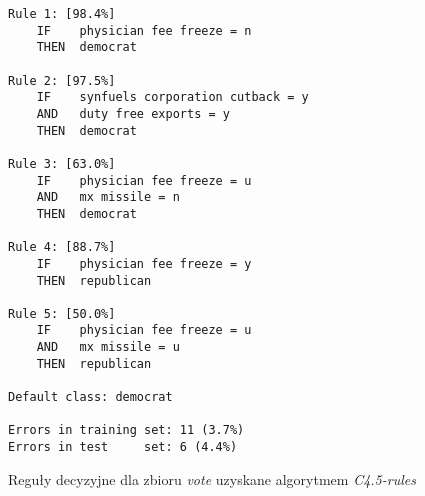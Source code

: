 \begin{figure}
\begin{verbatim}
Rule 1: [98.4%]
    IF    physician fee freeze = n
    THEN  democrat

Rule 2: [97.5%]
    IF    synfuels corporation cutback = y
    AND   duty free exports = y
    THEN  democrat

Rule 3: [63.0%]
    IF    physician fee freeze = u
    AND   mx missile = n
    THEN  democrat

Rule 4: [88.7%]
    IF    physician fee freeze = y
    THEN  republican

Rule 5: [50.0%]
    IF    physician fee freeze = u
    AND   mx missile = u
    THEN  republican

Default class: democrat

Errors in training set: 11 (3.7%)
Errors in test     set: 6 (4.4%)
\end{verbatim}
\caption{Reguły decyzyjne dla zbioru \emph{vote} uzyskane algorytmem \emph{C4.5-rules}}
\label{p2t2-vote-rules-c45}
\end{figure}
